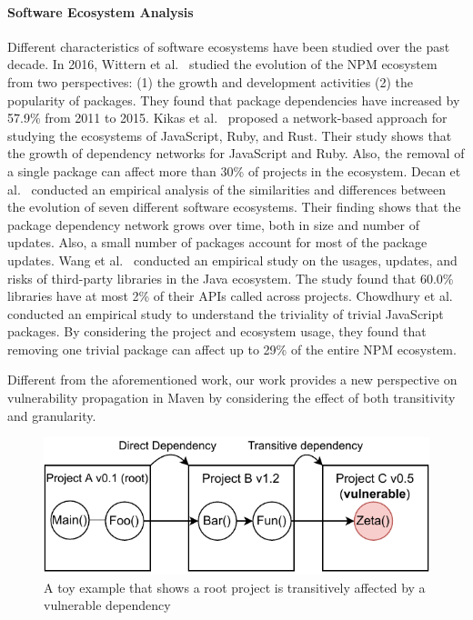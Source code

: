 \paragraph{Software Ecosystem Analysis}
Different characteristics of software ecosystems have been studied over the past decade. In 2016, Wittern et al.~\cite{wittern2016look} studied the evolution of the NPM ecosystem from two perspectives: (1) the growth and development activities (2) the popularity of packages. They found that package dependencies have increased by 57.9\% from 2011 to 2015.
Kikas et al.~\cite{kikas2017structure} proposed a network-based approach for studying the ecosystems of JavaScript, Ruby, and Rust. Their study shows that the growth of dependency networks for JavaScript and Ruby. Also, the removal of a single package can affect more than 30\% of projects in the ecosystem.
Decan et al.~\cite{decan2019empirical} conducted an empirical analysis of the similarities and differences between the evolution of seven different software ecosystems. Their finding shows that the package dependency network grows over time, both in size and number of updates. Also, a small number of packages account for most of the package updates.
Wang et al.~\cite{wang2020empirical} conducted an empirical study on the usages, updates, and risks of third-party libraries in the Java ecosystem. The study found that 60.0\% libraries have at most 2\% of their APIs called across projects.
Chowdhury et al.~\cite{chowdhury2021untriviality} conducted an empirical study to understand the triviality of trivial JavaScript packages. By considering the project and ecosystem usage, they found that removing one trivial package can affect up to 29\% of the entire NPM ecosystem.

Different from the aforementioned work, our work provides a new perspective on vulnerability propagation in Maven by considering the effect of both transitivity and granularity.

\begin{figure}
	\begin{center}
		\includegraphics[width=.8\linewidth]{chapters/ch3/figs/paper-toy-example.pdf}
	\end{center} \caption{A toy example that shows a root project is transitively affected by a vulnerable dependency}
	\label{ch3:fig:toy_example}
\end{figure}


